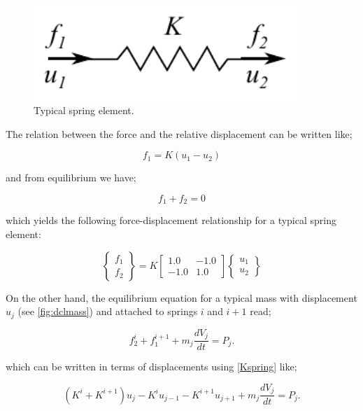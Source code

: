 \begin{figure}[H]
\centering
\includegraphics[width=10cm]{springel.pdf}
\caption{Typical spring element.}
\label{fig:springel}
\end{figure}

The relation between the force and the relative displacement can be written like;

\[{f_1} = K({u_1} - {u_2})\]

and from equilibrium we have;

\[{f_1} + {f_2} = 0\]

which yields the following force-displacement relationship for a typical spring element:

\begin{equation}
\left\{ {\begin{array}{*{20}{c}}
{{f_1}}\\
{{f_2}}
\end{array}} \right\} = K\left[ {\begin{array}{*{20}{c}}
{1.0}&{ - 1.0}\\
{ - 1.0}&{1.0}
\end{array}} \right]\left\{ {\begin{array}{*{20}{c}}
{{u_1}}\\
{{u_2}}
\end{array}} \right\}
\label{Kspring}
\end{equation}

On the other hand, the equilibrium equation for a typical mass with displacement $u_j$  (see \cref{fig:dclmass}) and attached to springs $i$ and $i+1$ read;

\begin{equation}
f_2^i + f_1^{i + 1} + {m_j}\frac{{d{V_j}}}{{dt}} = {P_j}.
\label{equilmass}
\end{equation}

which can be written in terms of displacements using \cref{Kspring} like;

\[({K^i} + {K^{i + 1}}){u_j} - {K^i}{u_{j - 1}} - {K^{i + 1}}{u_{j + 1}} + {m_j}\frac{{d{V_j}}}{{dt}} = {P_j}.\]


